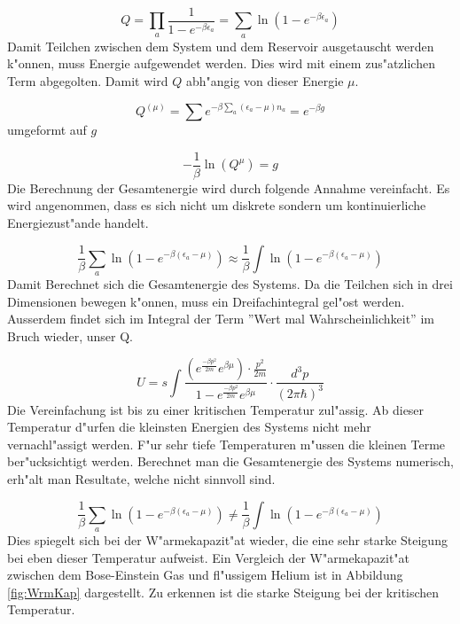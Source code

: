 \begin{refsection}
\begin{equation}
Q = \prod_{a} \frac {1}{1-e^{- \beta \epsilon_a}} = \sum_{a} \ln \left( 1-e^{- \beta \epsilon_a} \right)
\end{equation}
Damit Teilchen zwischen dem System und dem Reservoir ausgetauscht werden k"onnen, muss Energie aufgewendet werden.
Dies wird mit einem zus"atzlichen Term abgegolten. Damit wird $Q$ abh"angig von dieser Energie $\mu$.


 \begin{equation}
 Q^{(\mu)} = \sum e^{- \beta \sum_{a} (\epsilon_a - \mu)n_a} = e^{-\beta g}
 \end{equation}
umgeformt auf $g$

  \begin{equation}
  -\frac{1}{ \beta } \ln(Q^{\mu}) = g
  \end{equation}
Die Berechnung der Gesamtenergie wird durch folgende Annahme vereinfacht. 
Es wird angenommen, dass es sich nicht um diskrete sondern um kontinuierliche Energiezust"ande handelt.

\begin{equation}
\frac{1}{\beta} \sum_{a} \ln(1-e^{-\beta (\epsilon_a -\mu)}) \approx \frac{1}{\beta} \int \ln(1-e^{-\beta (\epsilon_a-\mu)})
\end{equation}
Damit Berechnet sich die Gesamtenergie des Systems.
Da die Teilchen sich in drei Dimensionen bewegen k"onnen, muss ein Dreifachintegral gel"ost werden.
Ausserdem findet sich im Integral der Term ''Wert mal Wahrscheinlichkeit'' im Bruch wieder, unser Q.

\begin{equation}
U = s \int  \frac{ \left(e^{ {\frac{- \beta p^2}{2m}} } e^{\beta \mu} \right) \cdot {\frac{p^2}{2m}} }{1-e^{ {\frac{- \beta p^2}{2m}} } e^{\beta \mu}} \cdot \frac{d^3 p}{(2 \pi \hbar)^3}
\end{equation}
Die Vereinfachung ist bis zu einer kritischen Temperatur zul"assig. Ab dieser Temperatur d"urfen die kleinsten Energien des Systems nicht mehr vernachl"assigt werden. F"ur sehr tiefe Temperaturen m"ussen die kleinen Terme ber"ucksichtigt werden. Berechnet man die Gesamtenergie des Systems numerisch, erh"alt man Resultate, welche nicht sinnvoll sind.

\begin{equation}
\frac{1}{\beta} \sum_{a} \ln(1-e^{-\beta (\epsilon_a-\mu)}) \neq \frac{1}{\beta} \int \ln(1-e^{-\beta (\epsilon_a-\mu)})
\end{equation}
Dies spiegelt sich bei der W"armekapazit"at wieder, die eine sehr starke Steigung bei eben dieser Temperatur aufweist. Ein Vergleich der W"armekapazit"at zwischen dem Bose-Einstein Gas und fl"ussigem Helium ist in Abbildung \ref{fig:WrmKap} dargestellt. Zu erkennen ist die starke Steigung bei der kritischen Temperatur.


\end{refsection}
